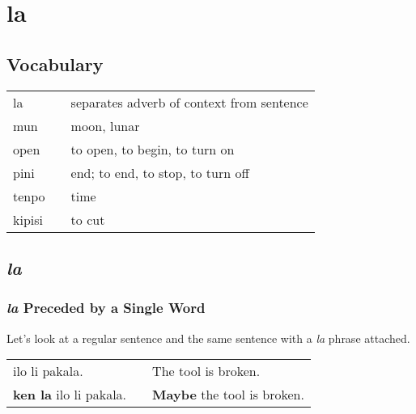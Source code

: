 \section{la}
%
\subsection*{Vocabulary}
%
\begin{supertabular}{p{5,5cm}|ll}
la && separates adverb of context from sentence \\
mun && moon, lunar  \\
open && to open, to begin, to turn on \\
pini && end; to end, to stop, to turn off \\
tenpo && time \\
kipisi &&  to cut \\
\end{supertabular} 
%
\subsection*{\textit{la}}
%
\subsubsection*{\textit{la} Preceded by a Single Word}
%
Let's look at a regular sentence and the same sentence with a \textit{la} phrase attached. 

\begin{supertabular}{p{5,5cm}|ll}
ilo li pakala. && The tool is broken. \\
\textbf{ken la} ilo li pakala. && \textbf{Maybe} the tool is broken. \\
\end{supertabular} 


